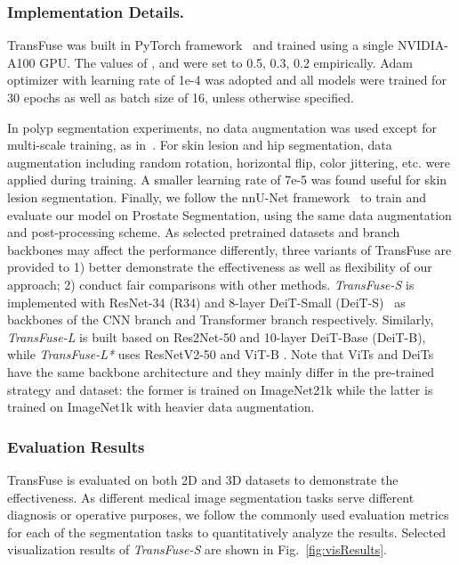 \documentclass[runningheads]{llncs}
\begin{document}
\subsubsection{Implementation Details.}
TransFuse was built in PyTorch framework~\cite{paszke2019pytorch} and trained using a single NVIDIA-A100 GPU. 
The values of ,  and  were set to 0.5, 0.3, 0.2 empirically. Adam optimizer with learning rate of 1e-4 was adopted and all models were trained for 30 epochs as well as batch size of 16, unless otherwise specified.

In polyp segmentation experiments, no data augmentation was used except for multi-scale training, as in~\cite{fan2020pranet,huang2021hardnet}.
For skin lesion and hip segmentation, data augmentation including random rotation, horizontal flip, color jittering, etc. were applied during training. A smaller learning rate of 7e-5 was found useful for skin lesion segmentation. 
Finally, we follow the nnU-Net framework~\cite{isensee2019automated} to train and evaluate our model on Prostate Segmentation, using the same data augmentation and post-processing scheme.  
As selected pretrained datasets and branch backbones may affect the performance differently, three variants of TransFuse are provided to 1) better demonstrate the effectiveness as well as flexibility of our approach; 2) conduct fair comparisons with other methods. 
\textit{TransFuse-S} is implemented with ResNet-34 (R34) and 8-layer DeiT-Small (DeiT-S)~\cite{touvron2020training} as backbones of the CNN branch and Transformer branch respectively. Similarly, \textit{TransFuse-L} is built based on Res2Net-50 and 10-layer DeiT-Base (DeiT-B), while  \textit{TransFuse-L*} uses ResNetV2-50 and ViT-B \cite{dosovitskiy2020image}. Note that ViTs and DeiTs have the same backbone architecture and they mainly differ in the pre-trained strategy and dataset: the former is trained on ImageNet21k while the latter is trained on ImageNet1k with heavier data augmentation.  

\subsubsection{Evaluation Results}
TransFuse is evaluated on both 2D and 3D datasets to demonstrate the effectiveness. As different medical image segmentation tasks serve different diagnosis or operative purposes, we follow the commonly used evaluation metrics for each of the segmentation tasks to quantitatively analyze the results. Selected visualization results of \textit{TransFuse-S} are shown in Fig.~\ref{fig:visResults}.
\end{document}
